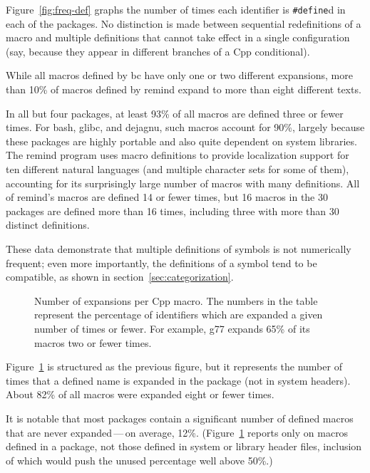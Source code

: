 \documentclass[11pt]{article}
\def\numpackages{30}
\newcommand{\pkg}[1]{\textsf{#1}}
\begin{document}
Figure~\ref{fig:freq-def} graphs the number of times each identifier is
{\tt \#define}d in each of the packages.  No distinction is made between
sequential redefinitions of a macro and multiple definitions that cannot
take effect in a single configuration (say, because they appear in
different branches of a Cpp conditional).

While all macros defined by \pkg{bc} have only one or two different
expansions, more than 10\% of macros defined by \pkg{remind} expand to more
than eight different texts.

In all but four packages, at least 93\% of all macros are defined three or
fewer times.  For \pkg{bash}, \pkg{glibc}, and \pkg{dejagnu}, such macros account for 90\%,
largely because these packages are highly portable and also quite dependent
on system libraries.  The \pkg{remind} program uses macro definitions to provide
localization support for ten different natural languages (and multiple
character sets for some of them), accounting for its surprisingly large
number of macros with many definitions.  All of \pkg{remind}'s macros are defined
14 or fewer times, but 16 macros in the {\numpackages} packages are defined
more than 16 times, including three with more than 30 distinct definitions.

These data demonstrate that multiple definitions of symbols is not
numerically frequent; even more importantly, the definitions of a symbol
tend to be compatible, as shown in section~\ref{sec:categorization}.


\begin{figure}
\centerline{}
\caption{Number of expansions per Cpp macro.  The numbers in the
  table represent the percentage of identifiers which are expanded a given
  number of times or fewer.  For example, \pkg{g77} expands 65\% of its
  macros two or fewer times.}
\label{fig:freq-use}
\end{figure}

Figure~\ref{fig:freq-use} is structured as the previous figure, but it
represents the number of times that a defined name is expanded in 
the package (not in system headers).  About 82\% of all macros were
expanded eight or fewer times.

It is notable that most packages contain a significant number of defined
macros that are never expanded\,---\,on average, 12\%.
(Figure~\ref{fig:freq-use} reports only on macros defined in a package, not
those defined in system or library header files, inclusion of which would
push the unused percentage well above 50\%.)
\end{document}
